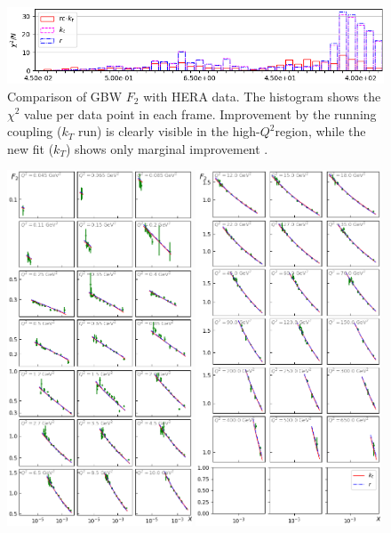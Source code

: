 \documentclass[11pt]{article}
\numberwithin{equation}{section}
\numberwithin{table}{section}
\numberwithin{figure}{section}
\begin{document}
\begin{figure}[p]
\includegraphics[width=\textwidth]{./plots/Figure_3.png}
\caption{Comparison of GBW $F_2$ with HERA data. The histogram shows the $\chi^2$ value per data point in each frame.
 Improvement by the running coupling ($k_T$ run) is clearly visible in the high-$Q^2$region, while the new fit ($k_T$) shows only marginal improvement .  }
\label{fig:GBW-Grid}
\end{figure}

\begin{figure}[p]
\includegraphics[width=0.49\textwidth]{./plots/Figure_2-1.png}
\includegraphics[width=0.49\textwidth]{./plots/Figure_2-2.png}

\end{figure}
\end{document}
